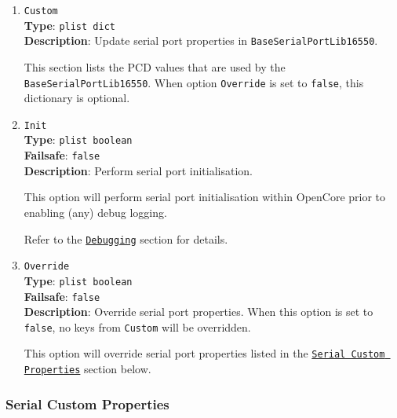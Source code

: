 \documentclass[]{article}
\begin{document}
\begin{enumerate}

\item
  \texttt{Custom}\\
  \textbf{Type}: \texttt{plist\ dict}\\
  \textbf{Description}: Update serial port properties in \texttt{BaseSerialPortLib16550}.

  This section lists the PCD values that are used by the \texttt{BaseSerialPortLib16550}.
  When option \texttt{Override} is set to \texttt{false}, this dictionary is optional.

\item
  \texttt{Init}\\
  \textbf{Type}: \texttt{plist\ boolean}\\
  \textbf{Failsafe}: \texttt{false}\\
  \textbf{Description}: Perform serial port initialisation.

  This option will perform serial port initialisation within OpenCore prior to enabling
  (any) debug logging.

  Refer to the \hyperref[troubleshootingdebug]{\texttt{Debugging}} section for details.

\item
  \texttt{Override}\\
  \textbf{Type}: \texttt{plist\ boolean}\\
  \textbf{Failsafe}: \texttt{false}\\
  \textbf{Description}: Override serial port properties.
  When this option is set to \texttt{false}, no keys from \texttt{Custom} will be overridden.

  This option will override serial port properties listed in the \hyperref[miscserialcustprops]{\texttt{Serial Custom Properties}}
  section below.

\end{enumerate}

\subsubsection{Serial Custom Properties}\label{miscserialcustprops}
\end{document}
